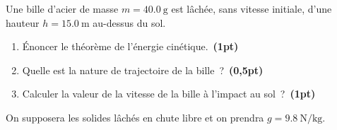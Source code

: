 Une bille d'acier de masse $m=\qty{40.0}{\g}$ est lâchée, sans vitesse initiale,
d'une hauteur $h=\qty{15.0}{\m}$ au-dessus du sol. 
\begin{enumerate}
    \item Énoncer le théorème de l'énergie cinétique.~\textbf{(1pt)}
    \item Quelle est la nature de trajectoire de la bille~?~\textbf{(0,5pt)}
    \item Calculer la valeur de la vitesse de la bille à l'impact au
          sol~?~\textbf{(1pt)}
\end{enumerate}

On supposera les solides lâchés en chute libre et on prendra
$g=\qty{9.8}{\N\per\kg}$.
